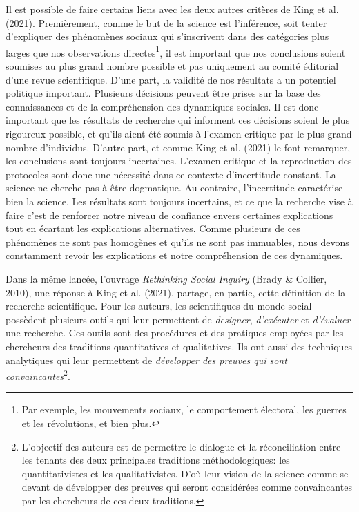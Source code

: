 \documentclass[
  letterpaper,
  DIV=11,
  numbers=noendperiod]{scrreprt}
\begin{document}
Il est possible de faire certains liens avec les deux autres critères de
King et al. (2021). Premièrement, comme le but de la science est
l'inférence, soit tenter d'expliquer des phénomènes sociaux qui
s'inscrivent dans des catégories plus larges que nos observations
directes\footnote{Par exemple, les mouvements sociaux, le comportement
  électoral, les guerres et les révolutions, et bien plus.}, il est
important que nos conclusions soient soumises au plus grand nombre
possible et pas uniquement au comité éditorial d'une revue scientifique.
D'une part, la validité de nos résultats a un potentiel politique
important. Plusieurs décisions peuvent être prises sur la base des
connaissances et de la compréhension des dynamiques sociales. Il est
donc important que les résultats de recherche qui informent ces
décisions soient le plus rigoureux possible, et qu'ils aient été soumis
à l'examen critique par le plus grand nombre d'individus. D'autre part,
et comme King et al. (2021) le font remarquer, les conclusions sont
toujours incertaines. L'examen critique et la reproduction des
protocoles sont donc une nécessité dans ce contexte d'incertitude
constant. La science ne cherche pas à être dogmatique. Au contraire,
l'incertitude caractérise bien la science. Les résultats sont toujours
incertains, et ce que la recherche vise à faire c'est de renforcer notre
niveau de confiance envers certaines explications tout en écartant les
explications alternatives. Comme plusieurs de ces phénomènes ne sont pas
homogènes et qu'ils ne sont pas immuables, nous devons constamment
revoir les explications et notre compréhension de ces dynamiques.

Dans la même lancée, l'ouvrage \emph{Rethinking Social Inquiry} (Brady
\& Collier, 2010), une réponse à King et al. (2021), partage, en partie,
cette définition de la recherche scientifique. Pour les auteurs, les
scientifiques du monde social possèdent plusieurs outils qui leur
permettent de \emph{designer}, \emph{d'exécuter} et \emph{d'évaluer} une
recherche. Ces outils sont des procédures et des pratiques employées par
les chercheurs des traditions quantitatives et qualitatives. Ils ont
aussi des techniques analytiques qui leur permettent de \emph{développer
des preuves qui sont convaincantes}\footnote{L'objectif des auteurs est
  de permettre le dialogue et la réconciliation entre les tenants des
  deux principales traditions méthodologiques: les quantitativistes et
  les qualitativistes. D'où leur vision de la science comme se devant de
  développer des preuves qui seront considérées comme convaincantes par
  les chercheurs de ces deux traditions.}.
\end{document}
